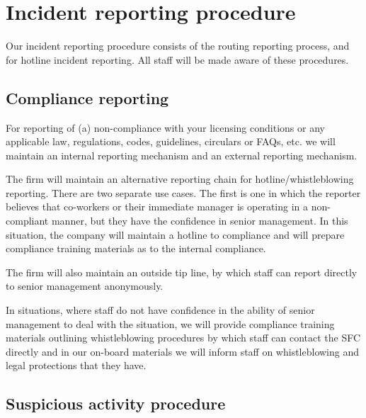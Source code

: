 \section{Incident reporting procedure}

Our incident reporting procedure consists of the routing reporting
process, and for hotline incident reporting.  All staff will be
made aware of these procedures.

\subsection{Compliance reporting}

For reporting of (a) non-compliance with your licensing conditions or
any applicable law, regulations, codes, guidelines, circulars or
FAQs, etc. we will maintain an internal reporting mechanism and an
external reporting mechanism.

The firm will maintain an alternative reporting chain for
hotline/whistleblowing reporting.  There are two separate use cases.
The first is one in which the reporter believes that co-workers or
their immediate manager is operating in a non-compliant manner, but
they have the confidence in senior management.  In this situation, the
company will maintain a hotline to compliance and will prepare
compliance training materials as to the internal compliance.

The firm will also maintain an outside tip line, by which staff can
report directly to senior management anonymously.

In situations, where staff do not have confidence in the ability of
senior management to deal with the situation, we will provide
compliance training materials outlining whistleblowing procedures by
which staff can contact the SFC directly and in our on-board materials
we will inform staff on whistleblowing and legal protections that
they have.

\subsection{Suspicious activity procedure}

